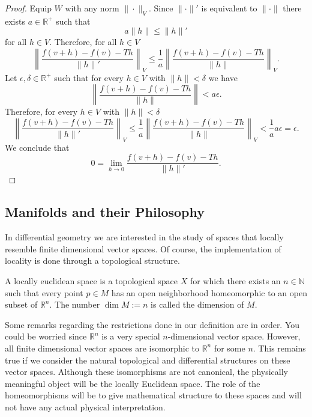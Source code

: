 \begin{proof}
Equip $W$ with any norm $\|\cdot\|_V$. Since $\|\cdot\|'$ is equivalent to $\|\cdot\|$ there exists $a\in\mathbb{R}^+$ such that
\begin{equation}
	a\|h\|\leq\|h\|'
\end{equation}
for all $h\in V$. Therefore, for all $h\in V$
\begin{equation}
	\left\lVert\frac{f(v+h)-f(v)-Th}{\|h\|'}\right\rVert_V\leq\frac{1}{a}\left\lVert\frac{f(v+h)-f(v)-Th}{\|h\|}\right\rVert_V.
\end{equation}
Let $\epsilon,\delta\in\mathbb{R}^+$ such that for every $h\in V$ with $\|h\|<\delta$ we have
\begin{equation}
	\left\lVert\frac{f(v+h)-f(v)-Th}{\|h\|}\right\rVert<a\epsilon.
\end{equation}
Therefore, for every $h\in V$ with $\|h\|<\delta$
\begin{equation}
	\left\lVert\frac{f(v+h)-f(v)-Th}{\|h\|'}\right\rVert_V\leq\frac{1}{a}\left\lVert\frac{f(v+h)-f(v)-Th}{\|h\|}\right\rVert_V<\frac{1}{a}a\epsilon=\epsilon.
\end{equation}
We conclude that 
\begin{equation}
	0=\lim_{h\rightarrow 0}\frac{f(v+h)-f(v)-Th}{\|h\|'}.
\end{equation}
\end{proof}

\subsection{Manifolds and their Philosophy}

In differential geometry we are interested in the study of spaces that locally resemble finite dimensional vector spaces. Of course, the implementation of locality is done through a topological structure. 

\begin{definition}

	A locally euclidean space is a topological space $X$ for which there exists an $n\in\mathbb{N}$ such that every point $p\in M$ has an open neighborhood homeomorphic to an open subset of $\mathbb{R}^n$. The number $\dim M:=n$ is called the dimension of $M$.

\end{definition}

Some remarks regarding the restrictions done in our definition are in order. You could be worried since $\mathbb{R}^n$ is a very special $n$-dimensional vector space. However, all finite dimensional vector spaces are isomorphic to $\mathbb{R}^n$ for some $n$. This remains true if we consider the natural topological and differential structures on these vector spaces. Although these isomorphisms are not canonical, the physically meaningful object will be the locally Euclidean space. The role of the homeomorphisms will be to give mathematical structure to these spaces and will not have any actual physical interpretation.

